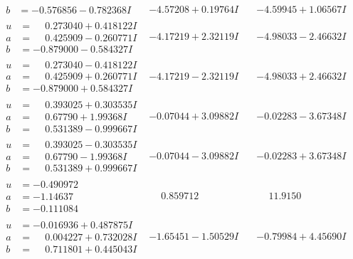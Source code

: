 \documentclass[1p]{elsarticle_modified}
\theoremstyle{definition}
\begin{document}
$$\begin{array}{c|c|c}
\begin{aligned}
b &= -0.576856 - 0.782368 I\end{aligned}
 & -4.57208 + 0.19764 I & -4.59945 + 1.06567 I \\ \hline\begin{aligned}
u &= \phantom{-}0.273040 + 0.418122 I \\
a &= \phantom{-}0.425909 - 0.260771 I \\
b &= -0.879000 - 0.584327 I\end{aligned}
 & -4.17219 + 2.32119 I & -4.98033 - 2.46632 I \\ \hline\begin{aligned}
u &= \phantom{-}0.273040 - 0.418122 I \\
a &= \phantom{-}0.425909 + 0.260771 I \\
b &= -0.879000 + 0.584327 I\end{aligned}
 & -4.17219 - 2.32119 I & -4.98033 + 2.46632 I \\ \hline\begin{aligned}
u &= \phantom{-}0.393025 + 0.303535 I \\
a &= \phantom{-}0.67790 + 1.99368 I \\
b &= \phantom{-}0.531389 - 0.999667 I\end{aligned}
 & -0.07044 + 3.09882 I & -0.02283 - 3.67348 I \\ \hline\begin{aligned}
u &= \phantom{-}0.393025 - 0.303535 I \\
a &= \phantom{-}0.67790 - 1.99368 I \\
b &= \phantom{-}0.531389 + 0.999667 I\end{aligned}
 & -0.07044 - 3.09882 I & -0.02283 + 3.67348 I \\ \hline\begin{aligned}
u &= -0.490972\phantom{ +0.000000I} \\
a &= -1.14637\phantom{ +0.000000I} \\
b &= -0.111084\phantom{ +0.000000I}\end{aligned}
 & \phantom{-}0.859712\phantom{ +0.000000I} & \phantom{-}11.9150\phantom{ +0.000000I} \\ \hline\begin{aligned}
u &= -0.016936 + 0.487875 I \\
a &= \phantom{-}0.004227 + 0.732028 I \\
b &= \phantom{-}0.711801 + 0.445043 I\end{aligned}
 & -1.65451 - 1.50529 I & -0.79984 + 4.45690 I \\ \hline\begin{aligned}

\end{aligned}
\end{array}$$
\end{document}
